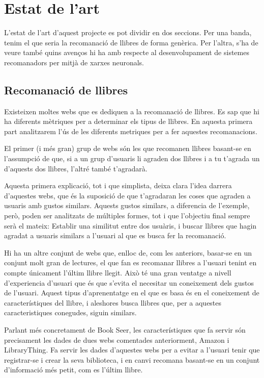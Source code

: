 \chapter{Estat de l'art}

L'estat de l'art d'aquest projecte es pot dividir en dos seccions. Per una banda, tenim el que seria la recomanació de llibres de forma genèrica. Per l'altra, s'ha de veure també quins avenços hi ha amb respecte al desenvolupament de sistemes recomanadors per mitjà de xarxes neuronals.

\section{Recomanació de llibres}
Existeixen moltes webs que es dediquen a la recomanació de llibres. Es sap que hi ha diferents mètriques per a determinar els tipus de llibres. En aquesta primera part analitzarem l'ús de les diferents metriques per a fer aquestes recomanacions.

El primer (i més gran) grup de webs són les que recomanen llibres basant-se en l'assumpció de que, si a un grup d'usuaris li agraden dos llibres i a tu t'agrada un d'aquests dos llibres, l'altré també t'agradarà\cite{Amazon,EntreLectores,Librofilia,Shelfari,Goodreads,Librarything}.

Aquesta primera explicació, tot i que simplista, deixa clara l'idea darrera d'aquestes webs, que és la suposició de que t'agradaran les coses que agraden a usuaris amb gustos similars. Aquests gustos similars, a diferencia de l'exemple, però, poden ser analitzats de múltiples formes, tot i que l'objectiu final sempre serà el mateix: Establir una similitut entre dos usuàris, i buscar llibres que hagin agradat a usuaris similars a l'usuari al que es busca fer la recomanació.

Hi ha un altre conjunt de webs que, enlloc de, com les anteriors, basar-se en un conjunt molt gran de lectures, el que fan es recomanar llibres a l'usuari tenint en compte únicament l'últim llibre llegit\cite{Bookseer,Whatshouldireadnext}. Això té una gran ventatge a nivell d'experiencia d'usuari que és que s'evita el necesitar un coneixement dels gustos de l'usuari. Aquest tipus d'aprenentatge en el que es basa és en el coneixement de característiques del llibre, i aleshores busca llibres que, per a aquestes caracteristiques conegudes, siguin similars.

Parlant més concretament de Book Seer\cite{Bookseer}, les característiques que fa servir són precisament les dades de dues webs comentades anteriorment, Amazon\cite{Amazon} i LibraryThing\cite{Librarything}. Fa servir les dades d'aquestes webs per a evitar a l'usuari tenir que registrar-se i crear la seva biblioteca, i en canvi recomana basant-se en un conjunt d'informació més petit, com es l'últim llibre\cite{Bookseer-usa-amazon}.


